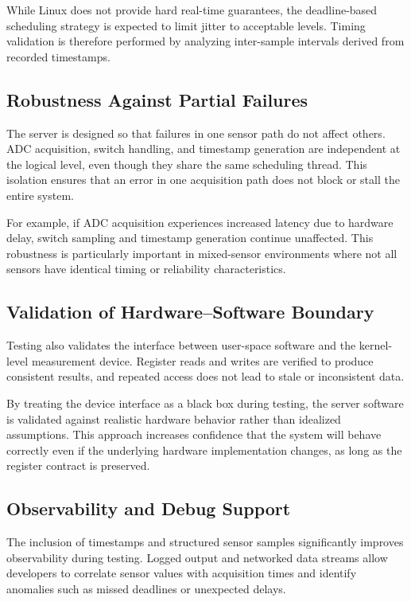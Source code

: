 While Linux does not provide hard real-time guarantees, the deadline-based scheduling strategy is expected to limit jitter to acceptable levels. Timing validation is therefore performed by analyzing inter-sample intervals derived from recorded timestamps.


\subsection{Robustness Against Partial Failures}
The server is designed so that failures in one sensor path do not affect others. ADC acquisition, switch handling, and timestamp generation are independent at the logical level, even though they share the same scheduling thread. This isolation ensures that an error in one acquisition path does not block or stall the entire system.

For example, if ADC acquisition experiences increased latency due to hardware delay, switch sampling and timestamp generation continue unaffected. This robustness is particularly important in mixed-sensor environments where not all sensors have identical timing or reliability characteristics.


\subsection{Validation of Hardware–Software Boundary}
Testing also validates the interface between user-space software and the kernel-level measurement device. Register reads and writes are verified to produce consistent results, and repeated access does not lead to stale or inconsistent data.

By treating the device interface as a black box during testing, the server software is validated against realistic hardware behavior rather than idealized assumptions. This approach increases confidence that the system will behave correctly even if the underlying hardware implementation changes, as long as the register contract is preserved.

\subsection{Observability and Debug Support}
The inclusion of timestamps and structured sensor samples significantly improves observability during testing. Logged output and networked data streams allow developers to correlate sensor values with acquisition times and identify anomalies such as missed deadlines or unexpected delays.

